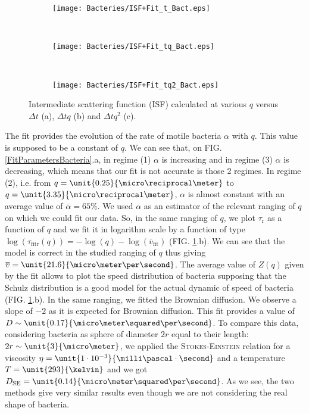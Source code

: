\documentclass[%
 aip,
 jmp,%
 amsmath,amssymb,
reprint,%
]{revtex4-1}
\begin{document}
\begin{figure}[H]
	\begin{subfigure}[b]{\linewidth}
		\centering
		\texttt{[image: Bacteries/ISF+Fit\_t\_Bact.eps]}		
	\end{subfigure}
	\\
	\begin{subfigure}[b]{\linewidth}
		\centering
		\texttt{[image: Bacteries/ISF+Fit\_tq\_Bact.eps]}
	\end{subfigure}
	\\
	\begin{subfigure}[b]{\linewidth}
		\centering
		\texttt{[image: Bacteries/ISF+Fit\_tq2\_Bact.eps]}
	\end{subfigure}
	\caption{Intermediate scattering function (ISF) calculated at various $q$ versus $\Delta t$ (a), $\Delta tq$ (b) and $\Delta tq^2$ (c).}
	\label{ISFBacteria}
\end{figure}

The fit provides the evolution of the rate of motile bacteria $\alpha$ with $q$. This value is supposed to be a constant of $q$. We can see that, on FIG. \ref{FitParametersBacteria}.a, in regime (1) $\alpha$ is increasing and in regime (3) $\alpha$ is decreasing, which means that our fit is not accurate is those 2 regimes. In regime (2), i.e. from $q = \unit{0.25}{\micro\reciprocal\meter}$ to $q = \unit{3.35}{\micro\reciprocal\meter}$, $\alpha$ is almost constant with an average value of $\overline{\alpha} = 65\%$. We used $\alpha$ as an estimator of the relevant ranging of $q$ on which we could fit our data. So, in the same ranging of $q$, we plot $\tau_\text{r}$ as a function of $q$ and we fit it in logarithm scale by a function of type $\log(\tau_\text{fitr}(q)) = -\log(q) - \log(\overline{v}_\text{fit})$ (FIG. \ref{ISFBacteria}.b). We can see that the model is correct in the studied ranging of $q$ thus giving $\overline{v} = \unit{21.6}{\micro\meter\per\second}$. The average value of $Z(q)$ given by the fit allows to plot the speed distribution of bacteria supposing that the Schulz distribution is a good model for the actual dynamic of speed of bacteria (FIG. \ref{ISFBacteria}.b). In the same ranging, we fitted the Brownian diffusion. We observe a slope of $-2$ as it is expected for Brownian diffusion. This fit provides a value of $D \sim \unit{0.17}{\micro\meter\squared\per\second}$. To compare this data, considering bacteria as sphere of diameter $2r$ equal to their length: $2r \sim \unit{3}{\micro\meter}$, we applied the \textsc{Stokes-Einstein} relation for a viscosity $\eta = \unit{1\cdot10^{-3}}{\milli\pascal\cdot\second}$ and a temperature $T=\unit{293}{\kelvin}$ and we got $D_\text{SE} = \unit{0.14}{\micro\meter\squared\per\second}$. As we see, the two methods give very similar results even though we are not considering the real shape of bacteria.
\end{document}
